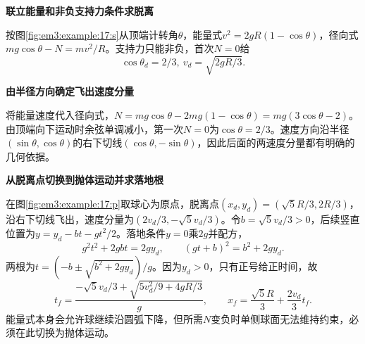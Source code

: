 \begin{solution}\textbf{联立能量和非负支持力条件求脱离}\par\nobreak
按图\ref{fig:em3:example:17:s}从顶端计转角$\theta$，能量式$v^2=2gR(1-\cos\theta)$，径向式$mg\cos\theta-N=mv^2/R$。支持力只能非负，首次$N=0$给
\[\boxed{\cos\theta_d=2/3,\ v_d=\sqrt{2gR/3}}.\]




\par\medskip{}\noindent\textbf{由半径方向确定飞出速度分量}\par\nobreak
将能量速度代入径向式，$N=mg\cos\theta-2mg(1-\cos\theta)=mg(3\cos\theta-2)$。由顶端向下运动时余弦单调减小，第一次$N=0$为$\cos\theta=2/3$。速度方向沿半径$(\sin\theta,\cos\theta)$的右下切线$(\cos\theta,-\sin\theta)$，因此后面的两速度分量都有明确的几何依据。



\par\medskip{}\noindent\textbf{从脱离点切换到抛体运动并求落地根}\par\nobreak
在图\ref{fig:em3:example:17:p}取球心为原点，脱离点$(x_d,y_d)=(\sqrt5R/3,2R/3)$，沿右下切线飞出，速度分量为$(2v_d/3,-\sqrt5v_d/3)$。令$b=\sqrt5v_d/3>0$，后续竖直位置为$y=y_d-bt-gt^2/2$。落地条件$y=0$乘$2g$并配方，
\[
g^2t^2+2gbt=2gy_d,\qquad
(gt+b)^2=b^2+2gy_d.
\]
两根为$t=(-b\pm\sqrt{b^2+2gy_d})/g$。因为$y_d>0$，只有正号给正时间，故
\[
t_f=\frac{-\sqrt5v_d/3+\sqrt{5v_d^2/9+4gR/3}}{g},
\qquad \boxed{x_f=\frac{\sqrt5R}{3}+\frac{2v_d}{3}t_f}.
\]
能量式本身会允许球继续沿圆弧下降，但所需$N$变负时单侧球面无法维持约束，必须在此切换为抛体运动。\end{solution}
